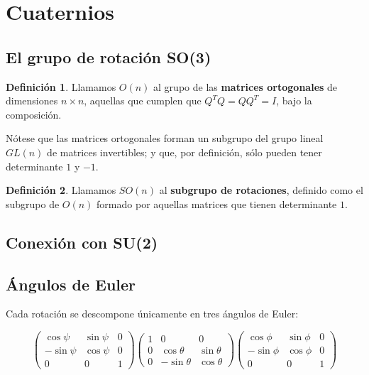 \documentclass{article}
\theoremstyle{plain}
\theoremstyle{definition}
\newtheorem{definition}{Definición}
\theoremstyle{remark}
\begin{document}
\maketitle

\newpage
\tableofcontents
\newpage


\section{Cuaternios}

\subsection{El grupo de rotación SO(3)}

\begin{definition}
  Llamamos $O(n)$ al grupo de las \textbf{matrices ortogonales}
  de dimensiones $n \times n$, aquellas que cumplen que $Q^TQ = QQ^T = I$,
  bajo la composición.
\end{definition}

Nótese que las matrices ortogonales forman un subgrupo del grupo
lineal $GL(n)$ de matrices invertibles; y que, por definición, sólo
pueden tener determinante $1$ y $-1$.

\begin{definition}
  Llamamos $SO(n)$ al \textbf{subgrupo de rotaciones}, definido como
  el subgrupo de $O(n)$ formado por aquellas matrices que tienen
  determinante $1$.
\end{definition}




\subsection{Conexión con SU(2)}
\cite{gelfand63}

\subsection{Ángulos de Euler}
Cada rotación se descompone únicamente en tres ángulos de Euler:

\[\begin{pmatrix}
    \cos \psi & \sin \psi & 0 \\
    -\sin \psi & \cos \psi & 0 \\
    0 & 0 & 1
  \end{pmatrix}\begin{pmatrix}
    1 & 0 & 0 \\
    0 & \cos \theta & \sin \theta \\
    0 & -\sin \theta & \cos \theta
  \end{pmatrix}\begin{pmatrix}
    \cos \phi & \sin \phi & 0 \\
    -\sin \phi & \cos \phi & 0 \\
    0 & 0 & 1
  \end{pmatrix}
\]
\end{document}
